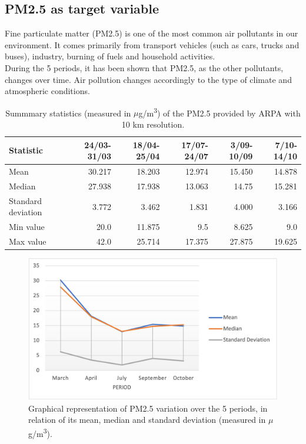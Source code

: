\subsection{PM2.5 as target variable}
Fine particulate matter (PM2.5) is one of the most common air pollutants in our environment. 
It comes primarily from transport vehicles (such as cars, trucks and buses), industry, burning of fuels and household activities. \\
During the 5 periods, it has been shown that PM2.5, as the other pollutants, changes over time. Air pollution changes accordingly to the type of climate and atmospheric conditions.\\
\begin{table}[H]
\centering
\begin{tabular}{lrrrrr}
\toprule
 Statistic &  24/03-31/03 &  18/04-25/04 &  17/07-24/07 &  3/09-10/09 &  7/10-14/10 \\
\midrule
  Mean  &        30.217  &         18.203  &         12.974 &       15.450 &       14.878 \\
Median  &        27.938 &        17.938 &        13.063 &       14.75 &       15.281 \\
 Standard deviation &        3.772 &        3.462 &        1.831 &       4.000 &       3.166 \\
  Min value &        20.0  &        11.875 &        9.5 &        8.625 &       9.0 \\
  Max value &        42.0 &        25.714 &        17.375 &        27.875 &       19.625 \\
\bottomrule
\end{tabular}
\caption{Summmary statistics (measured in $\mu$g/m\textsuperscript{3}) of the PM2.5 provided by ARPA with 10 km resolution.}
\label{tab:statspm25}
\end{table}
\begin{figure}[H]
    \centering
    \includegraphics[scale=0.8]{images/pm25_values.png}
    \caption{Graphical representation of PM2.5 variation over the 5 periods, in relation of its mean, median and standard deviation (measured in $\mu$g/m\textsuperscript{3}).}
    \label{fig:graphstatspm2.5}
\end{figure}
